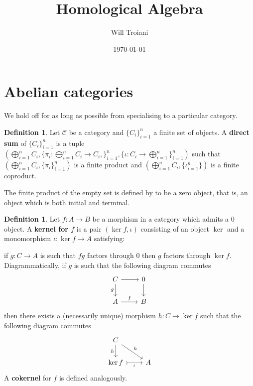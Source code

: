 \documentclass[12pt]{article}
\title{Homological Algebra}
\author{Will Troiani}
\date{\today}
\theoremstyle{plain}
\theoremstyle{definition}
\newtheorem{defn}[thm]{Definition} %
\newcommand{\scr}[1]{\mathscr{#1}}
\newcommand{\lto}{\longrightarrow}
\begin{document}
\maketitle
\tableofcontents

\section{Abelian categories}
We hold off for as long as possible from specialising to a particular category.
\begin{defn}
Let $\scr{C}$ be a category and $\lbrace C_i\rbrace_{i = 1}^n$ a finite set of objects. A \textbf{direct sum} of $\lbrace C_i\rbrace_{i=1}^n$ is a tuple $(\bigoplus_{i=1}^nC_i,\lbrace \pi_i: \bigoplus_{i = 1}^nC_i \lto C_i,\rbrace_{i = 1}^n, \lbrace \iota: C_i \lto \bigoplus_{i = 1}^n\rbrace_{i = 1}^n)$ such that $(\bigoplus_{i=1}^nC_i,\lbrace \pi_i\rbrace_{i = 1}^n)$ is a finite product and $(\bigoplus_{i=1}^nC_i,\lbrace \iota_{i = 1}^n\rbrace)$ is a finite coproduct.

The finite product of the empty set is defined by to be a zero object, that is, an object which is both initial and terminal.
\end{defn}
\begin{defn}
Let $f:A \lto B$ be a morphism in a category which admits a $0$ object. A \textbf{kernel for $f$} is a pair $(\operatorname{ker}f,\iota)$ consisting of an object $\operatorname{ker}$ and a monomorphism $\iota: \operatorname{ker}f \lto A$ satisfying:

if $g: C \lto A$ is such that $fg$ factors through $0$ then $g$ factors through $\operatorname{ker}f$. Diagrammatically,  if $g$ is such that the following diagram commutes
\begin{equation}
\begin{tikzcd}
C\arrow[r]\arrow[d,swap,"g"] & 0\arrow[d]\\
A\arrow[r,"f"] & B
\end{tikzcd}
\end{equation}
then there exists a (necessarily unique) morphism $h: C \lto \operatorname{ker}f$ such that the following diagram commutes
\begin{equation}
\begin{tikzcd}
C\arrow[d,swap,"h"]\arrow[dr,"h"]\\
\operatorname{ker}f\arrow[r,rightarrowtail,swap,"\iota"] & A
\end{tikzcd}
\end{equation}
A \textbf{cokernel} for $f$ is defined analogously.
\end{defn}
\end{document}
